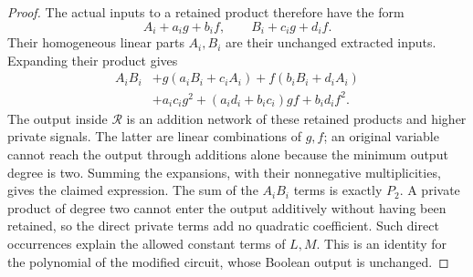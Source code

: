 \documentclass[11pt]{article}
\theoremstyle{definition}
\theoremstyle{remark}
\begin{document}
\begin{proof}
The actual inputs to a retained product therefore have the form
\[
 A_i+a_i g+b_i f,\qquad B_i+c_i g+d_i f.
\]
Their homogeneous linear parts $A_i,B_i$ are their unchanged extracted inputs. Expanding their product gives
\begin{align*}
 A_iB_i&+g(a_iB_i+c_iA_i)+f(b_iB_i+d_iA_i)\\
 &+a_ic_i g^2+(a_id_i+b_ic_i)gf+b_id_i f^2.
\end{align*}
The output inside $\mathcal R$ is an addition network of these retained products and higher private signals. The latter are linear combinations of $g,f$; an original variable cannot reach the output through additions alone because the minimum output degree is two. Summing the expansions, with their nonnegative multiplicities, gives the claimed expression. The sum of the $A_iB_i$ terms is exactly $P_2$. A private product of degree two cannot enter the output additively without having been retained, so the direct private terms add no quadratic coefficient. Such direct occurrences explain the allowed constant terms of $L,M$. This is an identity for the polynomial of the modified circuit, whose Boolean output is unchanged.
\end{proof}
\end{document}
